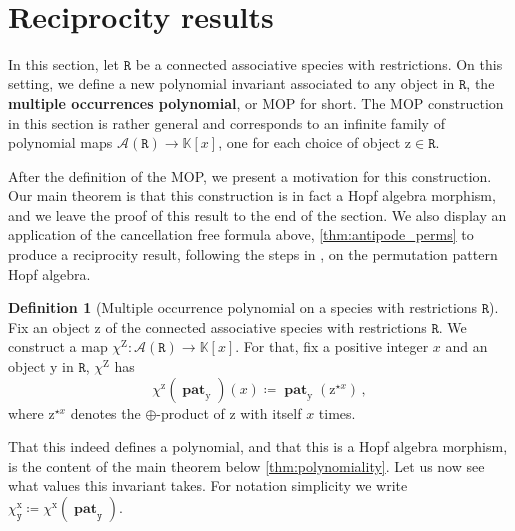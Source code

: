 \documentclass[12pt, reqno]{amsart}
\theoremstyle{definition}
\newtheorem{defin}[thm]{Definition}
\DeclareMathOperator{\pat}{\mathbf{pat}}
\begin{document}
\


\section{Reciprocity results\label{sec:reciprocity}}

In this section, let $\mathtt{R}$ be a connected associative species with restrictions.
On this setting, we define a new polynomial invariant associated to any object in $\mathtt{R}$, the \textbf{multiple occurrences polynomial}, or MOP for short.
The MOP construction in this section is rather general and corresponds to an infinite family of polynomial maps $\mathcal{A}(\mathtt{R}) \to \mathbb{K}[x]$, one for each choice of object $\mathrm{z} \in \mathtt{R}$.

After the definition of the MOP, we present a motivation for this construction.
Our main theorem is that this construction is in fact a Hopf algebra morphism, and we leave the proof of this result to the end of the section.
We also display an application of the cancellation free formula above, \cref{thm:antipode_perms} to produce a reciprocity result, following the steps in \cite{humpert2012incidence}, on the permutation pattern Hopf algebra.


\begin{defin}[Multiple occurrence polynomial on a species with restrictions $\mathtt{R}$]\label{MOPDef}
Fix an object $\mathrm{z}$ of the connected associative species with restrictions $\mathtt{R}$.
We construct a map $\chi^{\mathrm{Z}}: \mathcal{A}(\mathtt{R}) \to \mathbb{K}[x]$.
For that, fix a positive integer $x$ and an object $\mathrm{y}$ in $\mathtt{R}$, $\chi^{\mathrm{Z}}$ has
$$\chi^{\mathrm{z}}(\pat_{\mathrm{y}})(x) \coloneqq \pat_{\mathrm{y}}(\mathrm{z}^{\star x})\, , $$
where $\mathrm{z}^{\star x}$ denotes the $\oplus$-product of $\mathrm{z}$ with itself $x$ times.
\end{defin}

That this indeed defines a polynomial, and that this is a Hopf algebra morphism, is the content of the main theorem below \cref{thm:polynomiality}.
Let us now see what values this invariant takes.
For notation simplicity we write $\chi^{\mathrm{x}}_{\mathtt{y}} \coloneqq \chi^{\mathrm{x}}(\pat_{\mathtt{y}})$.
\end{document}
